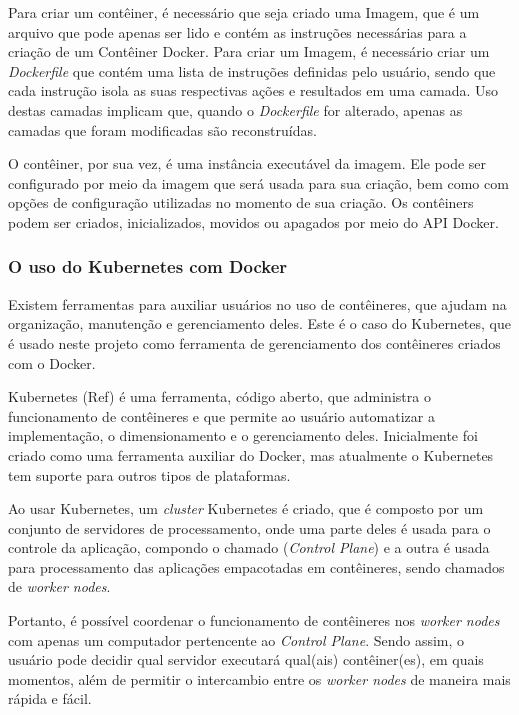 Para criar um contêiner, é necessário que seja criado uma Imagem, que é um arquivo que pode apenas ser lido e contém as instruções necessárias para a criação de um Contêiner Docker. Para criar um Imagem, é necessário criar um \textit{Dockerfile} que contém uma lista de instruções definidas pelo usuário, sendo que cada instrução isola as suas respectivas ações e resultados em uma camada. Uso destas camadas implicam que, quando o \textit{Dockerfile} for alterado, apenas as camadas que foram modificadas são reconstruídas.

O contêiner, por sua vez, é uma instância executável da imagem. Ele pode ser configurado por meio da imagem que será usada para sua criação, bem como com opções de configuração utilizadas no momento de sua criação. Os contêiners podem ser criados, inicializados, movidos ou apagados por meio do API Docker.

\subsubsection{\textbf{O uso do Kubernetes com Docker}}

Existem ferramentas para auxiliar usuários no uso de contêineres, que ajudam na organização, manutenção e gerenciamento deles. Este é o caso do Kubernetes, que é usado neste projeto como ferramenta de gerenciamento dos contêineres criados com o Docker.

Kubernetes (Ref) é uma ferramenta, código aberto, que administra o funcionamento de contêineres e que permite ao usuário automatizar a implementação, o dimensionamento e o gerenciamento deles. Inicialmente foi criado como uma ferramenta auxiliar do Docker, mas atualmente o Kubernetes tem suporte para outros tipos de plataformas.

Ao usar Kubernetes, um \textit{cluster} Kubernetes é criado, que é composto por um conjunto de servidores de processamento, onde uma parte deles é usada para o controle da aplicação, compondo o chamado (\textit{Control Plane}) e a outra é usada para processamento das aplicações empacotadas em contêineres, sendo chamados de \textit{worker nodes}. 

Portanto, é possível coordenar o funcionamento de contêineres nos \textit{worker nodes} com apenas um computador pertencente ao \textit{Control Plane}. Sendo assim, o usuário pode decidir qual servidor executará qual(ais) contêiner(es), em quais momentos, além de permitir o intercambio entre os \textit{worker nodes} de maneira mais rápida e fácil.

